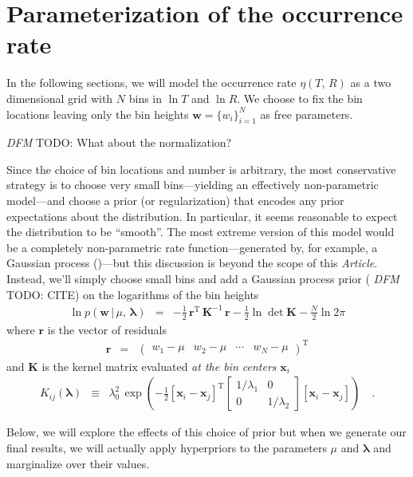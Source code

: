 \documentclass[12pt,preprint]{aastex}
\newcommand{\paper}{\emph{Article}}
\newcommand{\bvec}[1]{\ensuremath{\boldsymbol{#1}}}
\newcommand{\todo}[3]{{\color{#2} \emph{#1} TODO: #3}}
\newcommand{\dfmtodo}[1]{\todo{DFM}{red}{#1}}
\newcommand{\rate}{\ensuremath{\eta}}
\newcommand{\radius}{\ensuremath{R}}
\newcommand{\period}{\ensuremath{T}}
\newcommand{\bincenter}{{\ensuremath{\bvec{x}}}}
\newcommand{\binheight}{{\ensuremath{w}}}
\newcommand{\binheights}{{\ensuremath{\bvec{\binheight}}}}
\newcommand{\smooth}{{\ensuremath{\lambda}}}
\begin{document}
\section{Parameterization of the occurrence rate}

In the following sections, we will model the occurrence rate
$\rate(\period,\,\radius)$ as a two dimensional grid with $N$ bins in
$\ln\period$ and $\ln\radius$.
We choose to fix the bin locations leaving only the bin heights
$\binheights = \{\binheight_i\}_{i=1}^{N}$ as free parameters.

\dfmtodo{What about the normalization?}

Since the choice of bin locations and number is arbitrary, the most
conservative strategy is to choose very small bins---yielding an effectively
non-parametric model---and choose a prior (or regularization) that encodes any
prior expectations about the distribution.
In particular, it seems reasonable to expect the distribution to be
``smooth''.
The most extreme version of this model would be a completely non-parametric
rate function---generated by, for example, a Gaussian process
(\citealt{poiss-gp})---but this discussion is beyond the scope of this
\paper.
Instead, we'll simply choose small bins and add a Gaussian process prior
(\dfmtodo{CITE}) on the logarithms of the bin heights
\begin{eqnarray}
\ln p(\binheights\,|\,\mu,\,\bvec{\smooth}) &=&
-\frac{1}{2}\,\bvec{r}^\mathrm{T}\,\bvec{K}^{-1}\,\bvec{r}
-\frac{1}{2}\ln \det \bvec{K} - \frac{N}{2}\ln 2\pi
\end{eqnarray}
where $\bvec{r}$ is the vector of residuals
\begin{eqnarray}
\bvec{r} &=& \left(\begin{array}{cccc}
\binheight_1-\mu & \binheight_2-\mu & \cdots & \binheight_N-\mu
\end{array}\right)^\mathrm{T}
\end{eqnarray}
and $\bvec{K}$ is the kernel matrix evaluated \emph{at the bin centers}
$\bincenter_i$
\begin{eqnarray}
K_{ij}(\bvec{\smooth}) &\equiv& \smooth_0^2\,\exp \left(
-\frac{1}{2}[\bincenter_i-\bincenter_j]^\mathrm{T}
\left[\begin{array}{cc}
1/\smooth_1 & 0 \\ 0 & 1/\smooth_2
\end{array}\right]
[\bincenter_i-\bincenter_j] \right) \quad.
\end{eqnarray}

Below, we will explore the effects of this choice of prior but when we
generate our final results, we will actually apply hyperpriors to the
parameters $\mu$ and $\bvec{\smooth}$ and marginalize over their values.
\end{document}
